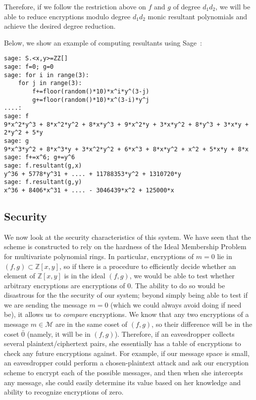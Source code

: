 \documentclass[11pt]{report}
\newcommand{\M}{\mathcal{M}}
\newcommand{\Zxy}{\mathbb{Z}[x,y]}
\begin{document}
Therefore, if we follow the restriction above on $f$ and $g$ of degree $d_1d_2$, we will be able to reduce encryptions modulo degree $d_1d_2$ monic resultant polynomials and achieve the desired degree reduction.

Below, we show an example of computing resultants using Sage~\cite{sage}:
\begin{verbatim}
sage: S.<x,y>=ZZ[]
sage: f=0; g=0
sage: for i in range(3):
    for j in range(3):
        f+=floor(random()*10)*x^i*y^(3-j)
        g+=floor(random()*10)*x^(3-i)*y^j
....:         
sage: f
9*x^2*y^3 + 8*x^2*y^2 + 8*x*y^3 + 9*x^2*y + 3*x*y^2 + 8*y^3 + 3*x*y + 2*y^2 + 5*y
sage: g
9*x^3*y^2 + 8*x^3*y + 3*x^2*y^2 + 6*x^3 + 8*x*y^2 + x^2 + 5*x*y + 8*x
sage: f+=x^6; g+=y^6
sage: f.resultant(g,x)
y^36 + 5778*y^31 + .... + 11788353*y^2 + 1310720*y
sage: f.resultant(g,y)
x^36 + 8406*x^31 + .... - 3046439*x^2 + 125000*x
\end{verbatim}

\subsection{Security}
\label{sec:mv_security}
We now look at the security characteristics of this system. We have seen that the scheme is constructed to rely on the hardness of the Ideal Membership Problem for multivariate polynomial rings. In particular, encryptions of $m=0$ lie in $(f,g)\subset \Zxy$, so if there is a procedure to efficiently decide whether an element of $\Zxy$ is in the ideal $(f,g)$, we would be able to test whether arbitrary encryptions are encryptions of $0$. The ability to do so would be disastrous for the the security of our system; beyond simply being able to test if we are sending the message $m=0$ (which we could always avoid doing if need be), it allows us to \emph{compare} encryptions. We know that any two encryptions of a message $m\in \M$ are in the same coset of $(f,g)$, so their difference will be in the coset $\bar{0}$ (namely, it will be in $(f,g)$). Therefore, if an eavesdropper collects several plaintext/ciphertext pairs, she essentially has a table of encryptions to check any future encryptions against. For example, if our message space is small, an eavesdropper could perform a chosen-plaintext attack and ask our encryption scheme to encrypt each of the possible messages, and then when she intercepts any message, she could easily determine its value based on her knowledge and ability to recognize encryptions of zero.
\end{document}
